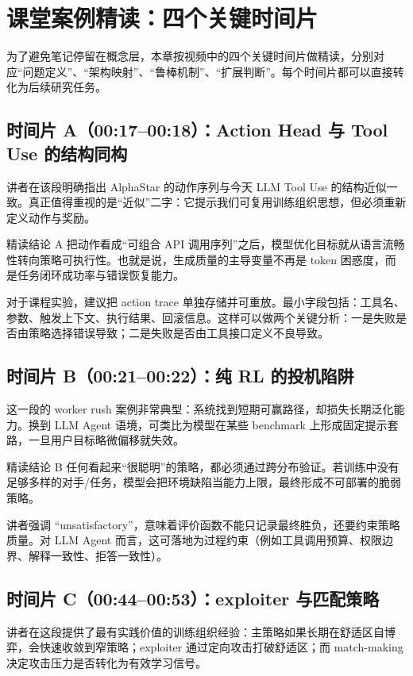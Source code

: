 \section{课堂案例精读：四个关键时间片}

为了避免笔记停留在概念层，本章按视频中的四个关键时间片做精读，分别对应``问题定义''、``架构映射''、``鲁棒机制''、``扩展判断''。每个时间片都可以直接转化为后续研究任务。

\subsection{时间片 A（00:17--00:18）：Action Head 与 Tool Use 的结构同构}
讲者在该段明确指出 AlphaStar 的动作序列与今天 LLM Tool Use 的结构近似一致。真正值得重视的是``近似''二字：它提示我们可复用训练组织思想，但必须重新定义动作与奖励。

\begin{importantbox}{精读结论 A}
把动作看成``可组合 API 调用序列''之后，模型优化目标就从语言流畅性转向策略可执行性。也就是说，生成质量的主导变量不再是 token 困惑度，而是任务闭环成功率与错误恢复能力。
\end{importantbox}

对于课程实验，建议把 action trace 单独存储并可重放。最小字段包括：工具名、参数、触发上下文、执行结果、回滚信息。这样可以做两个关键分析：一是失败是否由策略选择错误导致；二是失败是否由工具接口定义不良导致。

\subsection{时间片 B（00:21--00:22）：纯 RL 的投机陷阱}
这一段的 worker rush 案例非常典型：系统找到短期可赢路径，却损失长期泛化能力。换到 LLM Agent 语境，可类比为模型在某些 benchmark 上形成固定提示套路，一旦用户目标略微偏移就失效。

\begin{warningbox}{精读结论 B}
任何看起来``很聪明''的策略，都必须通过跨分布验证。若训练中没有足够多样的对手/任务，模型会把环境缺陷当能力上限，最终形成不可部署的脆弱策略。
\end{warningbox}

讲者强调 ``unsatisfactory''，意味着评价函数不能只记录最终胜负，还要约束策略质量。对 LLM Agent 而言，这可落地为过程约束（例如工具调用预算、权限边界、解释一致性、拒答一致性）。

\subsection{时间片 C（00:44--00:53）：exploiter 与匹配策略}
讲者在这段提供了最有实践价值的训练组织经验：主策略如果长期在舒适区自博弈，会快速收敛到窄策略；exploiter 通过定向攻击打破舒适区；而 match-making 决定攻击压力是否转化为有效学习信号。

